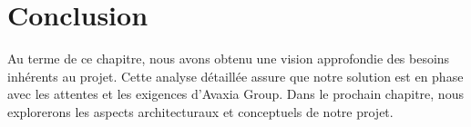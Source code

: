 
\section*{Conclusion}
 Au terme de ce chapitre, nous avons obtenu une vision approfondie des besoins inhérents au projet. Cette analyse détaillée assure que notre solution est en phase avec les attentes et les exigences d'Avaxia Group. Dans le prochain chapitre, nous explorerons les aspects architecturaux et conceptuels de notre projet.